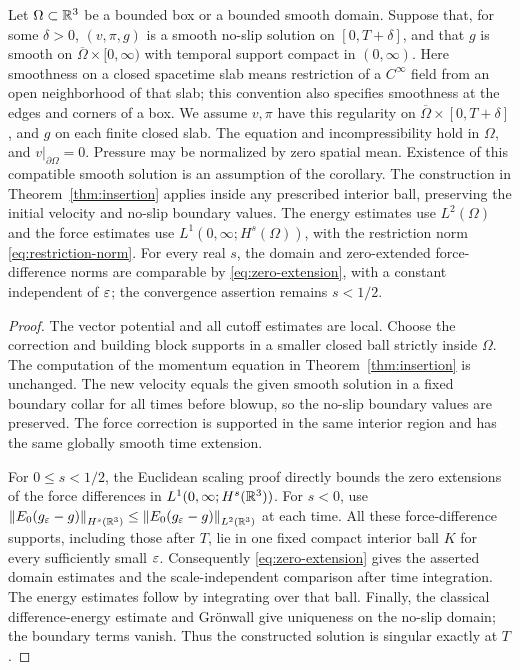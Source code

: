 \begin{corollary}\label{cor:boundary}
Let $\Omega\subset\mathbb R^3$ be a bounded box or a bounded smooth domain.
Suppose that, for some $\delta>0$, $(v,\pi,g)$ is a smooth no-slip
solution on $[0,T+\delta]$, and that $g$ is smooth on
$\overline\Omega\times[0,\infty)$ with temporal support compact in
$(0,\infty)$.
Here smoothness on a closed spacetime slab means restriction of a
$C^\infty$ field from an open neighborhood of that slab; this convention
also specifies smoothness at the edges and corners of a box. We assume
$v,\pi$ have this regularity on
$\overline\Omega\times[0,T+\delta]$, and $g$ on each finite closed slab.
The equation and incompressibility hold in $\Omega$, and
$v|_{\partial\Omega}=0$. Pressure may be normalized by zero spatial mean.
Existence of this compatible smooth solution is an assumption of the corollary.
The construction in Theorem~\ref{thm:insertion} applies inside any prescribed interior ball, preserving the initial velocity and no-slip boundary values.
The energy estimates use $L^2(\Omega)$ and the force estimates use
$L^1(0,\infty;H^s(\Omega))$, with the restriction norm
\eqref{eq:restriction-norm}. For every real $s$, the domain and zero-extended
force-difference norms are comparable by \eqref{eq:zero-extension}, with a
constant independent of $\varepsilon$; the convergence assertion remains $s<1/2$.
\end{corollary}
\begin{proof}
The vector potential and all cutoff estimates are local. Choose the correction and building block supports in a smaller closed ball strictly inside $\Omega$.
The computation of the momentum equation in Theorem~\ref{thm:insertion} is unchanged. The new velocity equals the given smooth solution in a fixed boundary collar for all times before blowup, so the no-slip boundary values are preserved. The force correction is supported in the same interior region and has the same globally smooth time extension.

For $0\le s<1/2$, the Euclidean scaling proof directly bounds the zero
extensions of the force differences in $L^1(0,\infty;H^s(\mathbb R^3))$.
For $s<0$, use $\left\lVert E_0(g_\varepsilon-g)\right\rVert_{H^s(\mathbb R^3)}
\le\left\lVert E_0(g_\varepsilon-g)\right\rVert_{L^2(\mathbb R^3)}$ at each time.
All these force-difference supports, including those after $T$, lie in one
fixed compact interior ball $K$ for every sufficiently small $\varepsilon$.
Consequently \eqref{eq:zero-extension} gives the asserted domain estimates
and the scale-independent comparison after time integration. The energy estimates follow by integrating over that ball. Finally, the classical difference-energy estimate and Gr\"onwall give uniqueness on the no-slip domain; the boundary terms vanish. Thus the constructed solution is singular exactly at $T$.
\end{proof}

